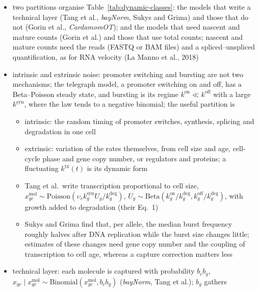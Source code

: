 \begin{itemize}
  \item two partitions organise Table~\ref{tab:dynamic-classes}: the models that write a technical layer (Tang et al.,
        \emph{bayNorm}, Sukys and Grima) and those that do not (Gorin et al., \emph{CardamomOT}); and the models that
        need nascent and mature counts (Gorin et al.) and those that use total counts; nascent and mature counts need the
        reads (FASTQ or BAM files) and a spliced--unspliced quantification, as for RNA velocity (La Manno et al., 2018)
  \item intrinsic and extrinsic noise: promoter switching and bursting are not two mechanisms; the telegraph model,
        a promoter switching on and off, has a Beta--Poisson steady state, and bursting is its regime
        \(k^{\mathrm{on}}\ll k^{\mathrm{off}}\) with a large \(k^{\mathrm{syn}}\), where the law tends to a negative binomial; the useful partition is
  \begin{itemize}
    \item intrinsic: the random timing of promoter switches, synthesis, splicing and degradation in one cell
    \item extrinsic: variation of the rates themselves, from cell size and age, cell-cycle phase and gene copy number,
          or regulators and proteins; a fluctuating \(k^{\mathrm{tx}}(t)\) is its dynamic form
    \item Tang et al.\ write transcription proportional to cell size,
          \(x^{\mathrm{mol}}_{gc}\sim\mathrm{Poisson}(\upsilon_{c}k^{\mathrm{syn}}_{g}U_{g}/k^{\mathrm{deg}}_{g})\),
          \(U_{g}\sim\mathrm{Beta}(k^{\mathrm{on}}_{g}/k^{\mathrm{deg}}_{g},k^{\mathrm{off}}_{g}/k^{\mathrm{deg}}_{g})\), with growth added to degradation
          (their Eq.~1)
    \item Sukys and Grima find that, per allele, the median burst frequency roughly halves after DNA replication
          while the burst size changes little; estimates of these changes need gene copy number and the coupling of
          transcription to cell age, whereas a capture correction matters less
  \end{itemize}
  \item technical layer: each molecule is captured with probability \(b_{c}b_{g}\),
        \(x_{gc}\mid x^{\mathrm{mol}}_{gc}\sim\mathrm{Binomial}(x^{\mathrm{mol}}_{gc},b_{c}b_{g})\) (\emph{bayNorm}, Tang et al.); \(b_{g}\) gathers

\end{itemize}
